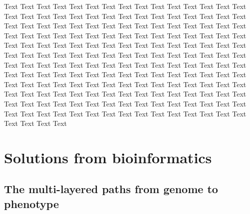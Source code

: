 \documentclass[letter]{bioinfo}
\begin{document}
Text Text Text Text Text Text  Text Text Text Text Text Text Text Text  Text Text Text Text Text Text Text Text  Text Text Text Text Text Text Text Text  Text Text Text Text Text Text Text Text  Text Text Text Text Text Text Text Text  Text Text Text Text Text Text Text Text  Text Text Text Text Text Text Text Text  Text Text Text Text Text Text Text Text  Text Text Text Text Text Text Text Text  Text Text Text Text Text Text Text Text  Text Text Text Text Text Text Text Text  Text Text Text Text Text Text Text Text  Text Text Text Text Text Text Text Text  Text Text Text Text Text Text Text Text  Text Text Text Text Text Text Text Text  Text Text Text Text Text Text Text Text  Text Text Text Text Text Text Text Text  Text Text Text Text Text Text Text Text  Text Text Text Text Text Text Text Text  Text Text Text Text Text Text Text Text  Text Text Text Text Text Text Text Text  Text Text Text Text Text Text Text Text  Text Text 
%
\section{Solutions from bioinformatics}
\subsection{The multi-layered paths from genome to phenotype}
\end{document}
